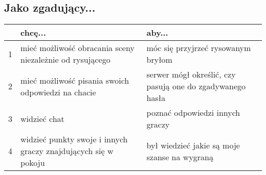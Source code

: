 \subsection{Jako zgadujący...}
\begin{center}
    \begin{tabular}{ | l | p{6cm} | p{6cm} |}
    \hline
     & \textbf{chcę...} & \textbf{aby...} \\ \hline
    1 & mieć możliwość obracania sceny niezależnie od rysującego & móc się przyjrzeć rysowanym bryłom \\ \hline
    2 & mieć możliwość pisania swoich odpowiedzi na chacie & serwer mógł określić, czy pasują one do zgadywanego hasła \\ \hline
    3 & widzieć chat & poznać odpowiedzi innych graczy \\ \hline
    4 & widzieć punkty swoje i innych graczy znajdujących się w pokoju & był wiedzieć jakie są moje szanse na wygraną \\ \hline
    \end{tabular}
\end{center}